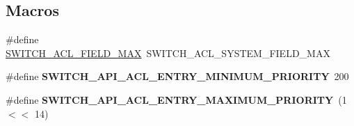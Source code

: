 \subsection*{Macros}
\begin{DoxyCompactItemize}
\item 
\#define \hyperlink{group__ACL_ga15b400c42bed1fe746f025608db774a5}{S\+W\+I\+T\+C\+H\+\_\+\+A\+C\+L\+\_\+\+F\+I\+E\+L\+D\+\_\+\+M\+A\+X}~S\+W\+I\+T\+C\+H\+\_\+\+A\+C\+L\+\_\+\+S\+Y\+S\+T\+E\+M\+\_\+\+F\+I\+E\+L\+D\+\_\+\+M\+A\+X
\item 
\hypertarget{group__ACL_gaf2d2046e282186359104b4af43c58910}{\#define {\bfseries S\+W\+I\+T\+C\+H\+\_\+\+A\+P\+I\+\_\+\+A\+C\+L\+\_\+\+E\+N\+T\+R\+Y\+\_\+\+M\+I\+N\+I\+M\+U\+M\+\_\+\+P\+R\+I\+O\+R\+I\+T\+Y}~200}\label{group__ACL_gaf2d2046e282186359104b4af43c58910}

\item 
\hypertarget{group__ACL_gad13d2541cac6aa6352af0c383180552c}{\#define {\bfseries S\+W\+I\+T\+C\+H\+\_\+\+A\+P\+I\+\_\+\+A\+C\+L\+\_\+\+E\+N\+T\+R\+Y\+\_\+\+M\+A\+X\+I\+M\+U\+M\+\_\+\+P\+R\+I\+O\+R\+I\+T\+Y}~(1 $<$$<$ 14)}\label{group__ACL_gad13d2541cac6aa6352af0c383180552c}

\end{DoxyCompactItemize}
